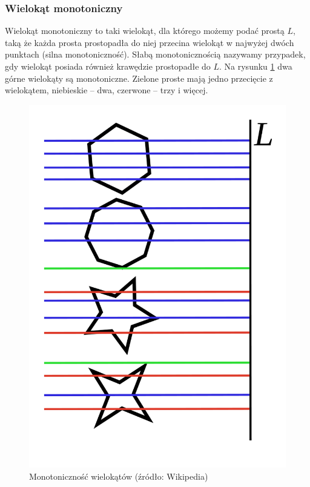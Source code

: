 \documentclass[12pt, a4paper]{article}
\begin{document}
\subsubsection*{Wielokąt monotoniczny}

Wielokąt monotoniczny to taki wielokąt, dla którego możemy podać prostą $L$, taką że każda prosta prostopadła do niej przecina wielokąt w najwyżej dwóch punktach (silna monotoniczność). Słabą monotonicznością nazywamy przypadek, gdy wielokąt posiada również krawędzie
prostopadłe do $L$. Na rysunku \ref{fig:wielokat_monotoniczny} dwa górne wielokąty są monotoniczne. Zielone proste mają jedno przecięcie z wielokątem, niebieskie – dwa, czerwone – trzy i więcej.

\begin{figure}[H]
  \begin{center}
  \includegraphics[scale=0.3]{Monotonic}
  \caption{Monotoniczność wielokątów (źródło: Wikipedia)}
  \label{fig:wielokat_monotoniczny}
  \end{center}
\end{figure}
\end{document}
